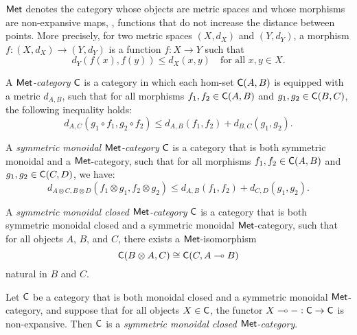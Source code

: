 \vspace{20pt}


\begin{definition}
    $\mathsf{Met}$ denotes the category whose objects are metric spaces and whose morphisms are non-expansive maps, \ie, functions that do not increase the distance between points. More precisely, for two metric spaces $(X, d_X)$ and $(Y, d_Y)$, a morphism $f: (X, d_X) \to (Y, d_Y)$ is a function $f: X \to Y$ such that
$$
d_Y(f(x), f(y)) \leq d_X(x, y) \quad \text{for all } x, y \in X.
$$
  \end{definition}

\begin{definition} \label{def:monoidal_closed_met_cat}
A \emph{$\mathsf{Met}$-category} $\mathsf{C}$ is a category in which each hom-set $\mathsf{C}(A, B)$ is equipped with a metric $d_{A,B}$, such that for all morphisms $f_1, f_2 \in \mathsf{C}(A, B)$ and $g_1, g_2 \in \mathsf{C}(B, C)$, the following inequality holds:
\[
  d_{A,C}(g_1 \circ f_1, g_2 \circ f_2) \leq d_{A,B}(f_1, f_2) + d_{B,C}(g_1, g_2).
\]

A \emph{symmetric monoidal $\mathsf{Met}$-category} $\mathsf{C}$ is a category that is both symmetric monoidal and a $\mathsf{Met}$-category, such that for all morphisms $f_1, f_2 \in \mathsf{C}(A, B)$ and $g_1, g_2 \in \mathsf{C}(C, D)$, we have:
\[
  d_{A \otimes C, B \otimes D}(f_1 \otimes g_1, f_2 \otimes g_2) \leq d_{A,B}(f_1, f_2) + d_{C,D}(g_1, g_2).
\]

A \emph{symmetric monoidal closed $\mathsf{Met}$-category} $\mathsf{C}$ is a category that is both symmetric monoidal closed and a symmetric monoidal $\mathsf{Met}$-category, such that for all objects $A$, $B$, and $C$, there exists a $\mathsf{Met}$-isomorphism
\[
  \mathsf{C}(B \otimes A, C ) \cong \mathsf{C}(C, A \multimap B)
\]
natural in $B$ and $C$.
\end{definition}


\begin{theorem}\cite[Theorem 4.2]{dahlqvist2022syntactic} 
Let $\mathsf{C}$ be a category that is both monoidal closed and a symmetric monoidal $\mathsf{Met}$- category, and suppose that for all objects $X \in \mathsf{C}$, the functor $X \multimap - : \mathsf{C} \to \mathsf{C}$ is non-expansive. Then $\mathsf{C}$ is a \emph{symmetric monoidal closed $\mathsf{Met}$-category}.
\end{theorem}


